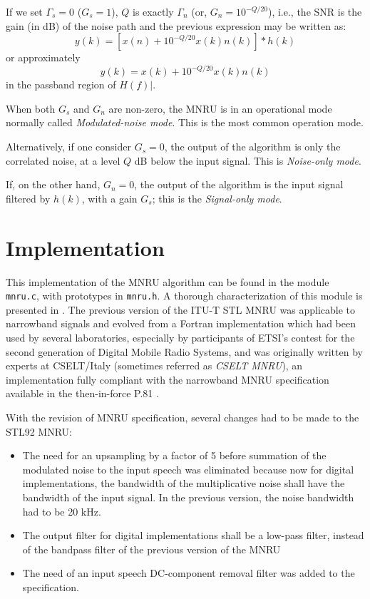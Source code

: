 If we set $\Gamma_s=0$ ($G_s=1$), $Q$ is exactly $\Gamma_n$ (or,
$G_n=10^{-Q/20}$), i.e., the SNR is the gain (in dB) of the noise path
and the previous expression may be written as:
\[
y(k)=[x(n)+10^{-Q/20} x(k) n(k)] \ast h(k)
\]
or approximately
\[
y(k)=x(k)+10^{-Q/20} x(k) n(k)
\]
in the passband region of $H(f)|$.

When both $G_s$ and $G_n$ are non-zero, the MNRU is in an operational
mode normally called {\em Modulated-noise mode}. This is the most
common operation mode.

Alternatively, if one consider $G_s=0$, the output of the algorithm is
only the correlated noise, at a level $Q$ dB below the input signal.
This is {\em Noise-only mode}.

If, on the other hand, $G_n=0$, the output of the algorithm is the
input signal filtered by $h(k)$, with a gain $G_s$; this is the {\em
Signal-only mode}.


\section{Implementation}

This implementation of the MNRU algorithm can be found in the module
{\tt mnru.c}, with prototypes in {\tt mnru.h}. A thorough
characterization of this module is presented in \cite{Duo-MNRU}. The
previous version of the ITU-T STL MNRU was applicable to narrowband
signals and evolved from a Fortran implementation which had been used
by several laboratories, especially by participants of ETSI's
contest for the second generation of Digital Mobile Radio Systems,
and was originally written by experts at CSELT/Italy (sometimes
referred as {\em CSELT MNRU}), an implementation fully compliant with
the narrowband MNRU specification available in the then-in-force P.81
\cite{Old-P.81}.

With the revision of MNRU specification, several changes had to be
made to the STL92 MNRU:
\begin{itemize}
  \item The need for an upsampling by a factor of 5 before summation
        of the modulated noise to the input speech was eliminated
        because now for digital implementations, the bandwidth of the
        multiplicative noise shall have the bandwidth of the input
        signal. In the previous version, the noise bandwidth had to be
        20 kHz.
  \item The output filter for digital implementations shall be a
        low-pass filter, instead of the bandpass filter of the
        previous version of the MNRU
  \item The need of an input speech DC-component removal filter
        was added to the specification.
\end{itemize}

